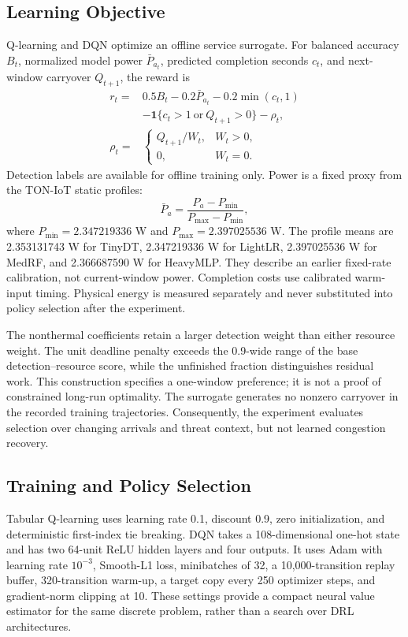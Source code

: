 \documentclass[journal]{IEEEtran}
\newcommand{\ind}{\mathbf{1}}
\begin{document}
\subsection{Learning Objective}
Q-learning and DQN optimize an offline service surrogate. For balanced accuracy $B_t$, normalized model power $\bar P_{a_t}$, predicted completion seconds $c_t$, and next-window carryover $Q_{t+1}$, the reward is
\begin{align}\label{eq:reward}
r_t={}&0.5B_t-0.2\bar P_{a_t}-0.2\min(c_t,1)\nonumber\\
&-\ind\{c_t>1\ \text{or}\ Q_{t+1}>0\}-\rho_t,\\
\rho_t={}&\begin{cases}Q_{t+1}/W_t,&W_t>0,\\0,&W_t=0.\end{cases}\nonumber
\end{align}
Detection labels are available for offline training only. Power is a fixed proxy from the TON-IoT static profiles:
\begin{equation}\label{eq:power}
\bar P_a=\frac{P_a-P_{\min}}{P_{\max}-P_{\min}},
\end{equation}
where $P_{\min}=2.347219336$ W and $P_{\max}=2.397025536$ W. The profile means are 2.353131743 W for TinyDT, 2.347219336 W for LightLR, 2.397025536 W for MedRF, and 2.366687590 W for HeavyMLP. They describe an earlier fixed-rate calibration, not current-window power. Completion costs use calibrated warm-input timing. Physical energy is measured separately and never substituted into policy selection after the experiment.

The nonthermal coefficients retain a larger detection weight than either resource weight. The unit deadline penalty exceeds the 0.9-wide range of the base detection--resource score, while the unfinished fraction distinguishes residual work. This construction specifies a one-window preference; it is not a proof of constrained long-run optimality. The surrogate generates no nonzero carryover in the recorded training trajectories. Consequently, the experiment evaluates selection over changing arrivals and threat context, but not learned congestion recovery.

\subsection{Training and Policy Selection}\label{sec:training}
Tabular Q-learning uses learning rate 0.1, discount 0.9, zero initialization, and deterministic first-index tie breaking. DQN takes a 108-dimensional one-hot state and has two 64-unit ReLU hidden layers and four outputs. It uses Adam with learning rate $10^{-3}$, Smooth-L1 loss, minibatches of 32, a 10,000-transition replay buffer, 320-transition warm-up, a target copy every 250 optimizer steps, and gradient-norm clipping at 10. These settings provide a compact neural value estimator for the same discrete problem, rather than a search over DRL architectures.
\end{document}
